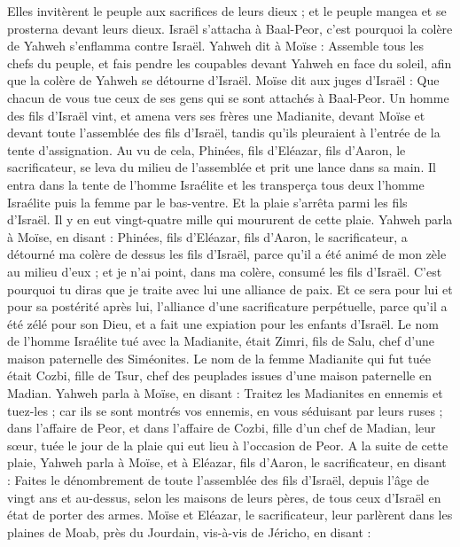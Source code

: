 \begin{multicols}{2}
Elles invitèrent le peuple aux sacrifices de leurs dieux ; et le peuple mangea et se prosterna devant leurs dieux.
Israël s'attacha à Baal-Peor, c'est pourquoi la colère de Yahweh s'enflamma contre Israël.
Yahweh dit à Moïse : Assemble tous les chefs du peuple, et fais pendre les coupables devant Yahweh en face du soleil, afin que la colère de Yahweh se détourne d'Israël.
Moïse dit aux juges d'Israël : Que chacun de vous tue ceux de ses gens qui se sont attachés à Baal-Peor.
Un homme des fils d'Israël vint, et amena vers ses frères une Madianite, devant Moïse et devant toute l'assemblée des fils d'Israël, tandis qu’ils pleuraient à l’entrée de la tente d'assignation.
Au vu de cela, Phinées, fils d'Eléazar, fils d'Aaron, le sacrificateur, se leva du milieu de l'assemblée et prit une lance dans sa main.
Il entra dans la tente de l'homme Israélite et les transperça tous deux l'homme Israélite puis la femme par le bas-ventre. Et la plaie s’arrêta parmi les fils d'Israël.
Il y en eut vingt-quatre mille qui moururent de cette plaie.
Yahweh parla à Moïse, en disant :
Phinées, fils d'Eléazar, fils d'Aaron, le sacrificateur, a détourné ma colère de dessus les fils d'Israël, parce qu'il a été animé de mon zèle au milieu d'eux ; et je n'ai point, dans ma colère, consumé les fils d'Israël.
C'est pourquoi tu diras que je traite avec lui une alliance de paix.
Et ce sera pour lui et pour sa postérité après lui, l’alliance d’une sacrificature perpétuelle, parce qu’il a été zélé pour son Dieu, et a fait une expiation pour les enfants d’Israël.
Le nom de l'homme Israélite tué avec la Madianite, était Zimri, fils de Salu, chef d'une maison paternelle des Siméonites.
Le nom de la femme Madianite qui fut tuée était Cozbi, fille de Tsur, chef des peuplades issues d’une maison paternelle en Madian.
Yahweh parla à Moïse, en disant :
Traitez les Madianites en ennemis et tuez-les ;
car ils se sont montrés vos ennemis, en vous séduisant par leurs ruses ; dans l’affaire de Peor, et dans l’affaire de Cozbi, fille d'un chef de Madian, leur sœur, tuée le jour de la plaie qui eut lieu à l’occasion de Peor.
\VerseOne{}A la suite de cette plaie, Yahweh parla à Moïse, et à Eléazar, fils d'Aaron, le sacrificateur, en disant :
Faites le dénombrement de toute l'assemblée des fils d'Israël, depuis l'âge de vingt ans et au-dessus, selon les maisons de leurs pères, de tous ceux d'Israël en état de porter des armes.
Moïse et Eléazar, le sacrificateur, leur parlèrent dans les plaines de Moab, près du Jourdain, vis-à-vis de Jéricho, en disant :

\end{multicols}

